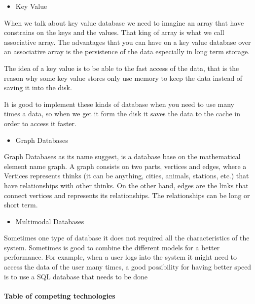 \documentclass[]{article}
\providecommand{\tightlist}{%
  \setlength{\itemsep}{0pt}\setlength{\parskip}{0pt}}
\let\oldparagraph\paragraph
\renewcommand{\paragraph}[1]{\oldparagraph{#1}\mbox{}}
\begin{document}
\begin{itemize}
\tightlist
\item
  Key Value
\end{itemize}

When we talk about key value database we need to imagine an array that
have constrains on the keys and the values. That king of array is what
we call associative array. The advantages that you can have on a key
value database over an associative array is the persistence of the data
especially in long term storage.

The idea of a key value is to be able to the fast access of the data,
that is the reason why some key value stores only use memory to keep the
data instead of saving it into the disk.

It is good to implement these kinds of database when you need to use
many times a data, so when we get it form the disk it saves the data to
the cache in order to access it faster.

\begin{itemize}
\tightlist
\item
  Graph Databases
\end{itemize}

Graph Databases as its name suggest, is a database base on the
mathematical element name graph. A graph consists on two parts, vertices
and edges, where a Vertices represents thinks (it can be anything,
cities, animals, stations, etc.) that have relationships with other
thinks. On the other hand, edges are the links that connect vertices and
represents its relationships. The relationships can be long or short
term.

\begin{itemize}
\tightlist
\item
  Multimodal Databases
\end{itemize}

Sometimes one type of database it does not required all the
characteristics of the system. Sometimes is good to combine the
different models for a better performance. For example, when a user logs
into the system it might need to access the data of the user many times,
a good possibility for having better speed is to use a SQL database that
needs to be done

\hypertarget{table-of-competing-technologies}{%
\paragraph{Table of competing
technologies}\label{table-of-competing-technologies}}
\end{document}
